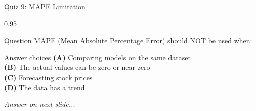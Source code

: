 \documentclass[9pt, aspectratio=169, t]{beamer}
\begin{document}
\begin{frame}{Quiz 9: MAPE Limitation}
    \begin{cminipage}{0.95\textwidth}
    \begin{alertblock}{Question}
        MAPE (Mean Absolute Percentage Error) should NOT be used when:
    \end{alertblock}

    \vspace{0.4cm}

    \begin{block}{Answer choices}
        \textcolor{MainBlue}{\textbf{(A)}} Comparing models on the same dataset\\[3pt]
        \textcolor{MainBlue}{\textbf{(B)}} The actual values can be zero or near zero\\[3pt]
        \textcolor{MainBlue}{\textbf{(C)}} Forecasting stock prices\\[3pt]
        \textcolor{MainBlue}{\textbf{(D)}} The data has a trend
    \end{block}

    \vspace{0.5cm}

    \begin{center}
        \textit{Answer on next slide...}
    \end{center}
    \end{cminipage}
\end{frame}
\end{document}

